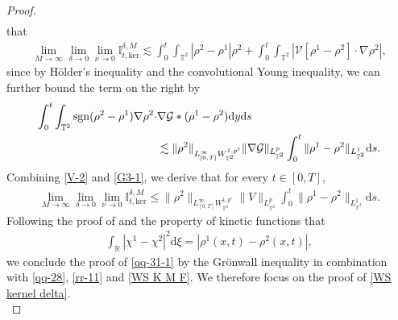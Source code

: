 \begin{proof}
\begin{align}
\end{align}
that 
\begin{align}\label{V-2}
  \lim_{M\rightarrow\infty}\lim_{\delta\rightarrow 0} \lim_{\nu\rightarrow 0}\mathbb{I}^{\delta,M}_{t,\mathrm{ker}}
  \lesssim  \int^t_0\int_{\mathbb{T}^2} |\rho^2 - \rho^1| \rho^2 + \int^t_0\int_{\mathbb{T}^2} \left| \mathcal{V}[\rho^1 - \rho^2]\cdot \nabla\rho^2\right|,
\end{align}
since by H\"{o}lder's inequality and the convolutional Young inequality, we can further bound the term on the right by
\begin{align}\label{G3-1}
\int^t_0\int_{\mathbb{T}^2}\operatorname{sgn}(\rho^2-\rho^1)\nabla\rho^2 \cdot
 & \nabla \mathcal{G}\ast (\rho^1-\rho^2)\mathrm{d}y\mathrm{d}s \nonumber \\ & \lesssim \|\rho^2\|_{L^\infty_{[0,T]}W^{1,p'}_{\mathbb{T}^2}}\|\nabla \mathcal{G}\|_{L^p_{\mathbb{T}^2}}\int^t_0\|\rho^1-\rho^2\|_{L^1_{\mathbb{T}^2}}\mathrm{d}s.
\end{align}
Combining \eqref{V-2} and \eqref{G3-1}, we derive that for every $t\in[0,T]$,
\begin{align}\label{WS K M F}
   \lim_{M\rightarrow\infty}\lim_{\delta\rightarrow 0} \lim_{\nu\rightarrow 0}\mathbb{I}^{\delta,M}_{t,\mathrm{ker}}\leq  \|\rho^2\|_{L_{[0,T]}^\infty W^{1,p'}_{\mathbb{T}^2}}\|V\|_{L^p_{\mathbb{T}^2}}\int_{0}^{t}\|\rho^1-\rho^2\|_{L^{1}_{\mathbb{T}^2}}\mathrm{d}s.
\end{align}
Following the proof of \cite[Theorem 3.3]{FG} and the property of kinetic functions that
\begin{align*}
\int_{\mathbb{R}}|\chi^1-\chi^2|^2\mathrm{d}\xi = |\rho^1(x,t)-\rho^2(x,t)|,
\end{align*}
we conclude the proof of \eqref{qq-31-1} by the Grönwall inequality in combination with \eqref{qq-28}, \eqref{rr-11} and \eqref{WS K M F}. We therefore focus on the proof of \eqref{WS kernel delta}. \\


\end{proof}
